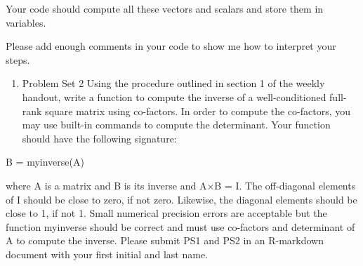 \documentclass[]{article}
\providecommand{\tightlist}{%
  \setlength{\itemsep}{0pt}\setlength{\parskip}{0pt}}
\begin{document}
Your code should compute all these vectors and scalars and store them in
variables.

Please add enough comments in your code to show me how to interpret your
steps.

\begin{enumerate}
\def\labelenumi{\arabic{enumi}.}
\setcounter{enumi}{1}
\tightlist
\item
  Problem Set 2 Using the procedure outlined in section 1 of the weekly
  handout, write a function to compute the inverse of a well-conditioned
  full-rank square matrix using co-factors. In order to compute the
  co-factors, you may use built-in commands to compute the determinant.
  Your function should have the following signature:
\end{enumerate}

B = myinverse(A)

where A is a matrix and B is its inverse and A×B = I. The off-diagonal
elements of I should be close to zero, if not zero. Likewise, the
diagonal elements should be close to 1, if not 1. Small numerical
precision errors are acceptable but the function myinverse should be
correct and must use co-factors and determinant of A to compute the
inverse. Please submit PS1 and PS2 in an R-markdown document with your
first initial and last name.
\end{document}

